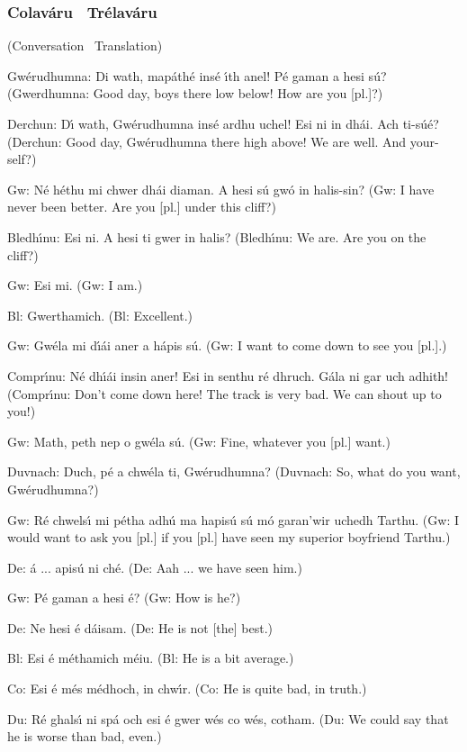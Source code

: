 \subsubsection{Colav\'{a}ru \textendash\ Tr\'{e}lav\'{a}ru}
(Conversation \textendash\ Translation)

Gw\'{e}rudhumna: Di wath, map\'{a}th\'{e} ins\'{e} \'{\i}th anel! P\'{e} gaman a hesi s\'{u}?
(Gwerdhumna: Good day, boys there low below! How are you [pl.]?)

Derchun: D\'{\i} wath, Gw\'{e}rudhumna ins\'{e} ardhu uchel! Esi ni in dh\'{a}i. Ach ti-s\'{u}\'{e}?
(Derchun: Good day, Gw\'{e}rudhumna there high above! We are well. And your-self?)

Gw: N\'{e} h\'{e}thu mi chwer dh\'{a}i diaman. A hesi s\'{u} gw\'{o} in halis-sin?
(Gw: I have never been better. Are you [pl.] under this cliff?)

Bledh\'{\i}nu: Esi ni. A hesi ti gwer in halis?
(Bledh\'{\i}nu: We are. Are you on the cliff?)

Gw: Esi mi.
(Gw: I am.)

Bl: Gwerthamich.
(Bl: Excellent.)

Gw: Gw\'{e}la mi d\'{\i}\'{a}i aner a h\'{a}pis s\'{u}.
(Gw: I want to come down to see you [pl.].)

Compr\'{\i}nu: N\'{e} dh\'{\i}\'{a}i insin aner! Esi in senthu r\'{e} dhruch. G\'{a}la ni gar uch adhith!
(Compr\'{\i}nu: Don't come down here! The track is very bad. We can shout up to you!)

Gw: Math, peth nep o gw\'{e}la s\'{u}.
(Gw: Fine, whatever you [pl.] want.)

Duvnach: Duch, p\'{e} a chw\'{e}la ti, Gw\'{e}rudhumna?
(Duvnach: So, what do you want, Gw\'{e}rudhumna?)

Gw: R\'{e} chwels\'{\i} mi p\'{e}tha adh\'{u} ma hapis\'{u} s\'{u} m\'{o} garan’wir uchedh Tarthu.
(Gw: I would want to ask you [pl.] if you [pl.] have seen my superior boyfriend Tarthu.)

De: \'{a} ... apis\'{u} ni ch\'{e}.
(De: Aah ... we have seen him.)

Gw: P\'{e} gaman a hesi \'{e}?
(Gw: How is he?)

De: Ne hesi \'{e} d\'{a}isam.
(De: He is not [the] best.)

Bl: Esi \'{e} m\'{e}thamich m\'{e}iu.
(Bl: He is a bit average.)

Co: Esi \'{e} m\'{e}s m\'{e}dhoch, in chw\'{\i}r.
(Co: He is quite bad, in truth.)

Du: R\'{e} ghals\'{\i} ni sp\'{a} och esi \'{e} gwer w\'{e}s co w\'{e}s, cotham.
(Du: We could say that he is worse than bad, even.)

